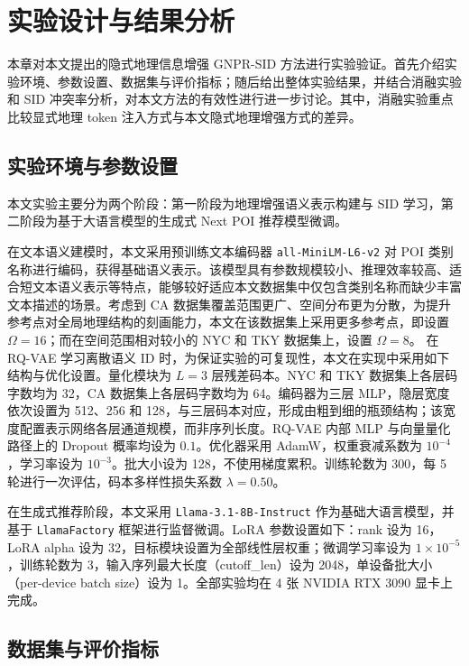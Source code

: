 \chapter{实验设计与结果分析}
\label{cha:experiment}

本章对本文提出的隐式地理信息增强 GNPR-SID 方法进行实验验证。首先介绍实验环境、参数设置、数据集与评价指标；随后给出整体实验结果，并结合消融实验和 SID 冲突率分析，对本文方法的有效性进行进一步讨论。其中，消融实验重点比较显式地理 token 注入方式与本文隐式地理增强方式的差异。

\section{实验环境与参数设置}
\label{sec:exp_setting}

本文实验主要分为两个阶段：第一阶段为地理增强语义表示构建与 SID 学习，第二阶段为基于大语言模型的生成式 Next POI 推荐模型微调。

在文本语义建模时，本文采用预训练文本编码器 \texttt{all-MiniLM-L6-v2} 对 POI 类别名称进行编码，获得基础语义表示。该模型具有参数规模较小、推理效率较高、适合短文本语义表示等特点，能够较好适应本文数据集中仅包含类别名称而缺少丰富文本描述的场景。考虑到 CA 数据集覆盖范围更广、空间分布更为分散，为提升参考点对全局地理结构的刻画能力，本文在该数据集上采用更多参考点，即设置 $\Omega=16$；而在空间范围相对较小的 NYC 和 TKY 数据集上，设置 $\Omega=8$。
在 RQ-VAE 学习离散语义 ID 时，为保证实验的可复现性，本文在实现中采用如下结构与优化设置。量化模块为 $L=3$ 层残差码本。NYC 和 TKY 数据集上各层码字数均为 32，CA 数据集上各层码字数均为 64。编码器为三层 MLP，隐层宽度依次设置为 512、256 和 128，与三层码本对应，形成由粗到细的瓶颈结构；该宽度配置表示网络各层通道规模，而非序列长度。RQ-VAE 内部 MLP 与向量量化路径上的 Dropout 概率均设为 $0.1$。优化器采用 AdamW，权重衰减系数为 $10^{-4}$，学习率设为 $10^{-3}$。批大小设为 128，不使用梯度累积。训练轮数为 300，每 5 轮进行一次评估，码本多样性损失系数 $\lambda=0.50$。

在生成式推荐阶段，本文采用 \texttt{Llama-3.1-8B-Instruct} 作为基础大语言模型，并基于 \texttt{LlamaFactory} 框架进行监督微调。LoRA 参数设置如下：rank 设为 16，LoRA alpha 设为 32，目标模块设置为全部线性层权重；微调学习率设为 $1\times10^{-5}$，训练轮数为 3，输入序列最大长度（cutoff\_len）设为 2048，单设备批大小（per-device batch size）设为 1。全部实验均在 4 张 NVIDIA RTX 3090 显卡上完成。

\section{数据集与评价指标}
\label{sec:dataset_metric}

